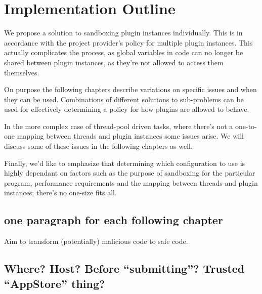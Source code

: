 \chapter {Implementation Outline}

We propose a solution to sandboxing plugin instances individually. This is in
accordance with the project provider's policy for multiple plugin instances.
This actually complicates the process, as global variables in code can no
longer be shared between plugin instances, as they're not allowed to access
them themselves.

On purpose the following chapters describe variations on specific issues and
when they can be used. Combinations of different solutions to sub-problems can
be used for effectively determining a policy for how plugins are allowed to
behave.

In the more complex case of thread-pool driven tasks, where there's not a
one-to-one mapping between threads and plugin instances some issues arise. We
will discuss some of these issues in the following chapters as well.

Finally, we'd like to emphasize that determining which configuration to use is
highly dependant on factors such as the purpose of sandboxing for the
particular program, performance requirements and the mapping between threads
and plugin instances; there's no one-size fits all.


\section {one paragraph for each following chapter}

Aim to transform (potentially) malicious code to safe code.


\section {Where? Host? Before ``submitting''? Trusted ``AppStore'' thing?}


